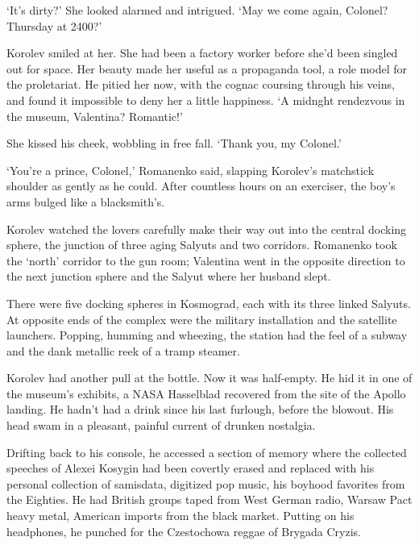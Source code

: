 `It's dirty?' She looked alarmed and intrigued. `May we come again, Colonel? Thursday at 2400?'

Korolev smiled at her. She had been a factory worker before she'd been singled out for space. Her beauty made her useful as a propaganda tool, a role model for the proletariat. He pitied her now, with the cognac coursing through his veins, and found it impossible to deny her a little happiness. `A midnght rendezvous in the museum, Valentina? Romantic!'

She kissed his cheek, wobbling in free fall. `Thank you, my Colonel.'

`You're a prince, Colonel,' Romanenko said, slapping Korolev's matchstick shoulder as gently as he could. After countless hours on an exerciser, the boy's arms bulged like a blacksmith's.

Korolev watched the lovers carefully make their way out into the central docking sphere, the junction of three aging Salyuts and two corridors. Romanenko took the `north' corridor to the gun room; Valentina went in the opposite direction to the next junction sphere and the Salyut where her husband slept.

There were five docking spheres in Kosmograd, each with its three linked Salyuts. At opposite ends of the complex were the military installation and the satellite launchers. Popping, humming and wheezing, the station had the feel of a subway and the dank metallic reek of a tramp steamer.

Korolev had another pull at the bottle. Now it was half-empty. He hid it in one of the museum's exhibits, a NASA Hasselblad recovered from the site of the Apollo landing. He hadn't had a drink since his last furlough, before the blowout. His head swam in a pleasant, painful current of drunken nostalgia.

Drifting back to his console, he accessed a section of memory where the collected speeches of Alexei Kosygin had been covertly erased and replaced with his personal collection of samisdata, digitized pop music, his boyhood favorites from the Eighties. He had British groups taped from West German radio, Warsaw Pact heavy metal, American imports from the black market. Putting on his headphones, he punched for the Czestochowa reggae of Brygada Cryzis.

